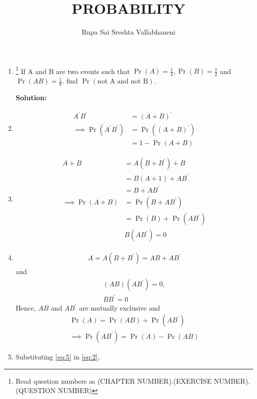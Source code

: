 \documentclass{article}
\providecommand{\brak}[1]{\ensuremath{\left(#1\right)}}
\newcommand{\solution}{\noindent \textbf{Solution: }}
\providecommand{\pr}[1]{\ensuremath{\Pr\left(#1\right)}}
\begin{document}
\title{PROBABILITY}
\author{\Large Rupa Sai Sreshta Vallabhaneni}
\date{}

\maketitle
\begin{enumerate}[label=13.\arabic{enumi}.\arabic{enumii}]%
\setcounter{enumi}{1}
\setcounter{enumii}{9}

\item \footnote{Read question numbers as (CHAPTER NUMBER).(EXERCISE NUMBER).(QUESTION NUMBER)} If A and B are two events such that $\pr{A} = \frac{1}{4}, \pr{B} = \frac{1}{2}$ and $\pr{A B} = \frac{1}{8}$. find $\pr{\text{not A and not B}}$.

\solution
\item 
\begin{align}
A^{\prime}B^{\prime} &=  \brak{A+B}^{\prime}
\\
\implies \pr{A^{\prime}B^{\prime}} &=  \pr{\brak{A+B}^{\prime}} 
\\
&= 1 - \pr{A+B} 
\label{eq:1}
\end{align} 
\item 
\begin{align}
 A+B &= A\brak{B+B^{\prime}} + B
\\
&= B \brak{A +1} + A B^{\prime}
\\
&=B + A B^{\prime}
\\
\implies \pr{A+B} &= \pr{B + A B^{\prime} }
\\
&=\pr{B}+\pr{ A B^{\prime} } 
\\
&B \brak{ A B^{\prime} } = 0
\label{eq:2}
\end{align}
\item 
\begin{align}
A = A \brak{B+B^{\prime}} =  AB + AB^{\prime}
\label{eq:3}
\end{align}
and 
\begin{align}
\brak{ AB}\brak{  AB^{\prime}} = 0, 
\\
 BB^{\prime} = 0
\label{eq:4}
\end{align}
Hence, $AB$ and $AB^{\prime}$ are mutually exclusive and 
%
\begin{align}
\pr{A} = \pr{AB} + \pr{AB^{\prime}}
\\
\implies 
\pr{AB^{\prime}} =  \pr{A} - \pr{AB}
\label{eq:5}
\end{align}
\item Substituting \eqref{eq:5} in \eqref{eq:2}, 

\end{enumerate}
\end{document}
